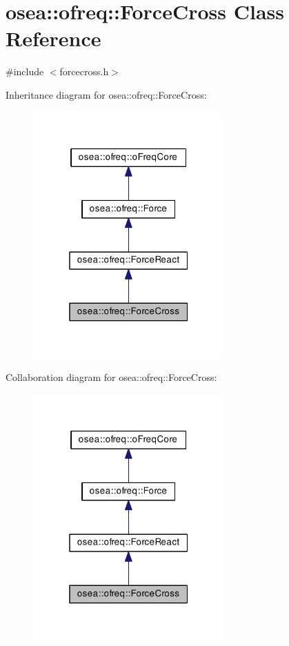 \hypertarget{classosea_1_1ofreq_1_1_force_cross}{\section{osea\-:\-:ofreq\-:\-:Force\-Cross Class Reference}
\label{classosea_1_1ofreq_1_1_force_cross}
}


{\ttfamily \#include $<$forcecross.\-h$>$}



Inheritance diagram for osea\-:\-:ofreq\-:\-:Force\-Cross\-:
\nopagebreak
\begin{figure}[H]
\begin{center}
\leavevmode
\includegraphics[width=208pt]{classosea_1_1ofreq_1_1_force_cross__inherit__graph}
\end{center}
\end{figure}


Collaboration diagram for osea\-:\-:ofreq\-:\-:Force\-Cross\-:
\nopagebreak
\begin{figure}[H]
\begin{center}
\leavevmode
\includegraphics[width=208pt]{classosea_1_1ofreq_1_1_force_cross__coll__graph}
\end{center}
\end{figure}
